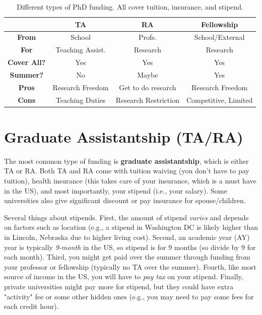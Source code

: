 \documentclass[oneside,11pt,dvipsnames]{book}
\begin{document}
\begin{table}
  \centering
  \small
  \caption{Different types of PhD funding. All cover tuition, insurance, and stipend.}\label{tab:funding}
  \begin{tabular}{c|c|c|c}
    \toprule
    &\textbf{TA}&\textbf{RA}&\textbf{Fellowship}\\
    \midrule
    \textbf{From} & School & Profs. & School/External\\
    \textbf{For}                  & Teaching Assist.       & Research                        & Research                              \\
    \textbf{Cover All?} & Yes                      & Yes                             & Yes                                   \\
    \textbf{Summer?}              & No                       & Maybe                           & Yes                                   \\
    \midrule
    \textbf{Pros}                 & Research Freedom         & Get to do research              & Research Freedom                      \\
    \textbf{Cons}                 & Teaching Duties           & Research Restriction & Competitive, Limited             \\
    \bottomrule
  \end{tabular}
\end{table}

\section{Graduate Assistantship (TA/RA)}\label{sec:ta-ra}
The most common type of funding is \textbf{graduate assistantship}, which is either TA or RA. Both TA and RA come with tuition waiving (you don't have to pay tuition), health insurance (this takes care of your insurance, which is a must have in the US), and most importantly, your stipend (i.e., your salary). Some universities also give significant discount or pay insurance for spouse/children.

Several things about stipends.  First, the amount of stipend \emph{varies} and depends on factors such as location (e.g., a stipend in Washington DC is likely higher than in Lincoln, Nebraska due to higher living cost). Second, an academic year (AY)  year is typically \emph{9-month} in the US, so stipend is for 9 months (so divide by 9 for each month). Third, you might get paid over the summer through funding from your professor or fellowship (typically no TA over the summer). Fourth, like most source of income in the US, you will have to \emph{pay tax} on your stipend.  Finally, private universities might pay more for stipend, but they could have extra "activity" fee or some other hidden ones (e.g., you may need to pay some fees for each credit hour).
\end{document}
